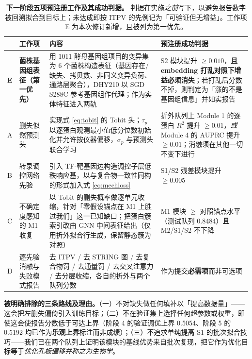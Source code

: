 \begin{table}[H]
\centering\footnotesize
\renewcommand{\arraystretch}{1.05}
\caption{\textbf{下一阶段五项预注册工作及其成功判据。} 判据在实施\emph{之前}写下，以避免报告数字被回溯拟合到目标上；未达成即按 ITPV 的先例记为「可验证但无增益」。工作项 E 为本次修订新增，且被列为第一优先。}
\label{tab:plan}
\begin{tabularx}{\textwidth}{@{}p{0.45cm}R{3.2cm}XR{4.3cm}@{}}
\toprule
& \textbf{工作项} & \textbf{内容} & \textbf{预注册成功判据} \\
\midrule
\textbf{E} & \textbf{菌株基因组表征}\newline\NEW{}\textbf{（第一优先）} & 用 1011 酵母基因组项目\citep{peter2018_1011genomes}的变异集为 6 个菌株构造表征（基因存在/缺失、拷贝数、非同义变异负荷、通路层聚合），DHY210 以 SGD S288C 参考基因组\citep{engel2022sgd}作代理；作为实体特征进入两轨 & S2 模块提升 $\ge0.010$，\textbf{且 embedding 打乱对照下增益必须消失}；若打乱后分数不掉，则判定为「涨的不是基因组信息」并如实报告 \\
A & 删失似然预测头 & 实现式 \eqref{eq:tobit} 的 Tobit 头；$\tau_p$ 以逐蛋白观测最小值低分位数初始化并允许按仪器偏移，$\sigma_p$ 与预测头联合学习 & 折外队列上 Module 1 的逐蛋白 $R^2$ 提升 $\ge0.01$，\emph{或} Module 4 的 AUPRC 提升 $\ge0.01$；消融须在其他一切不变下进行 \\
B & 转录调控网络先验 & 引入 TF-靶基因边\citep{Harbison2004RegulatoryCode,Teixeira2018YEASTRACT,Kemmeren2014RegulatoryNetworks}构造调控子层低秩响应基，以与复合物一致性同构的形式加入式 \eqref{eq:mechloss} & S1/S2 残差模块提升 $\ge0.005$ \\
C & 不确定度感知的 M1 收复 & 以 Tobit 的删失概率做逐单元收缩，针对「零假设锚点在 M1 上胜过我们」这一已知缺口；把蛋白簇索引改由 GNN 中间表征给出（仅用折外拟合行生成，保留静态簇为对照） & M1 模块 $\ge$ 对照锚点水平（测试队列 0.8484）\textbf{且} M2/S1/S2 不下降 \\
D & 逐先验消融与失败模式报告 & 去 ITPV / 去 STRING 图 / 去复合物罚 / 去通量罚 / 去交叉注意力 / 去分层收缩，各自的折外与两个队列分数 & 作为提交\textbf{必需项}而非可选项 \\
\bottomrule
\end{tabularx}
\end{table}

\textbf{被明确排除的三条路线及理由。}（一）不对缺失做任何填补以「提高数据量」——这会把左删失偏倚引入训练目标；（二）不在验证集上选择任何超参数或权重，即使这会使报告分数低于可达上界（阶段 4 的验证调优上界 0.5054、阶段 5 的 0.5192 均已作为\textbf{乐观上界}标注而非成绩）；（三）不追求单纯提高 S1 的批次拟合技巧——我们已在两个队列上证明该模块的基线优势来自批次复现，把它作为优化目标等于\emph{优化孔板偏移并称之为生物学}。

